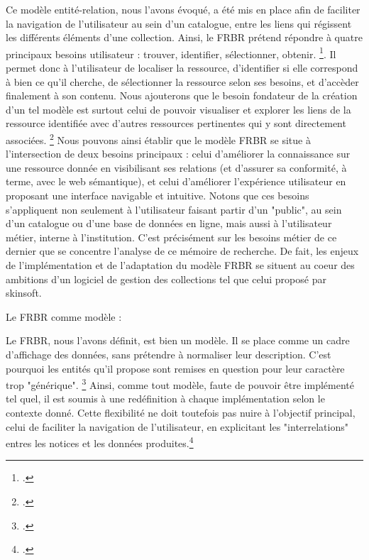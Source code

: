Ce modèle entité-relation, nous l'avons évoqué, a été mis en place afin de faciliter la navigation de l'utilisateur au sein d'un catalogue, entre les liens qui régissent les différents éléments d'une collection. Ainsi, le FRBR  prétend répondre à quatre principaux besoins utilisateur : trouver, identifier, sélectionner, obtenir. \footcite{zotero-item-653}. Il permet donc à l'utilisateur de localiser la ressource, d'identifier si elle correspond à bien ce qu'il cherche, de sélectionner la ressource selon ses besoins, et d'accèder finalement à son contenu. Nous ajouterons que le besoin fondateur de la création d'un tel modèle est surtout celui de pouvoir visualiser et explorer les liens de la ressource identifiée avec d'autres ressources pertinentes qui y sont directement associées. \footcite{zotero-item-653} Nous pouvons ainsi établir que le modèle FRBR se situe à l'intersection de deux besoins principaux : celui d'améliorer la connaissance sur une ressource donnée en visibilisant ses relations (et d'assurer sa conformité, à terme, avec le web sémantique), et celui d'améliorer l'expérience utilisateur  en proposant une interface navigable et intuitive. Notons que ces besoins s'appliquent non seulement à l'utilisateur faisant partir d'un "public", au sein d'un catalogue ou d'une base de données en ligne, mais aussi à l'utilisateur métier, interne à l'institution. C'est précisément sur les besoins métier de ce dernier que se concentre l'analyse de ce mémoire de recherche. De fait, les enjeux de l'implémentation et de l'adaptation du modèle FRBR se situent au coeur des ambitions d'un logiciel de gestion des collections tel que celui proposé par skinsoft.  




Le FRBR comme modèle : 

Le FRBR, nous l'avons définit, est bien un modèle. Il se place comme un cadre d'affichage des données, sans prétendre à normaliser leur description. C'est pourquoi les entités qu'il propose sont remises en question pour leur caractère trop "générique". \footcite{boeuf2008} Ainsi, comme tout modèle, faute de pouvoir être implémenté tel quel, il est soumis à une redéfinition à chaque implémentation selon le contexte donné. Cette flexibilité ne doit toutefois pas nuire à l'objectif principal, celui de faciliter la navigation de l'utilisateur, en explicitant les "interrelations" entres les notices et les données produites.\footcite{boeuf2008}

